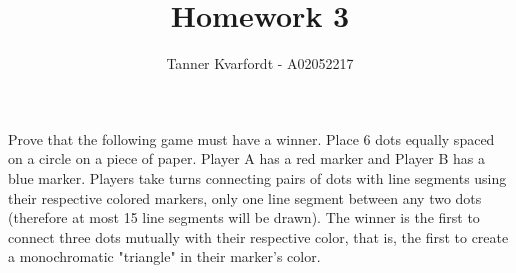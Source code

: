 \documentclass[12pt]{article}
\newenvironment{problem}[2][Problem]{\begin{trivlist}
\item[\hskip \labelsep {\bfseries #1}\hskip \labelsep {\bfseries #2.}]}{\end{trivlist}}
\begin{document}
 
 
\title{Homework 3}
\author{Tanner Kvarfordt - A02052217}
\maketitle
 
\begin{problem}{1}
Prove that the following game must have a winner. Place 6 dots equally spaced on a circle on a piece of paper. Player A has a red marker and Player B has a blue marker. Players take turns connecting pairs of dots with line segments using their respective colored markers, only one line segment between any two dots (therefore at most 15 line segments will be drawn). The winner is the first to connect three dots mutually with their respective color, that is, the first to create a monochromatic "triangle" in their marker's color.
\end{problem}
 
\end{document}
